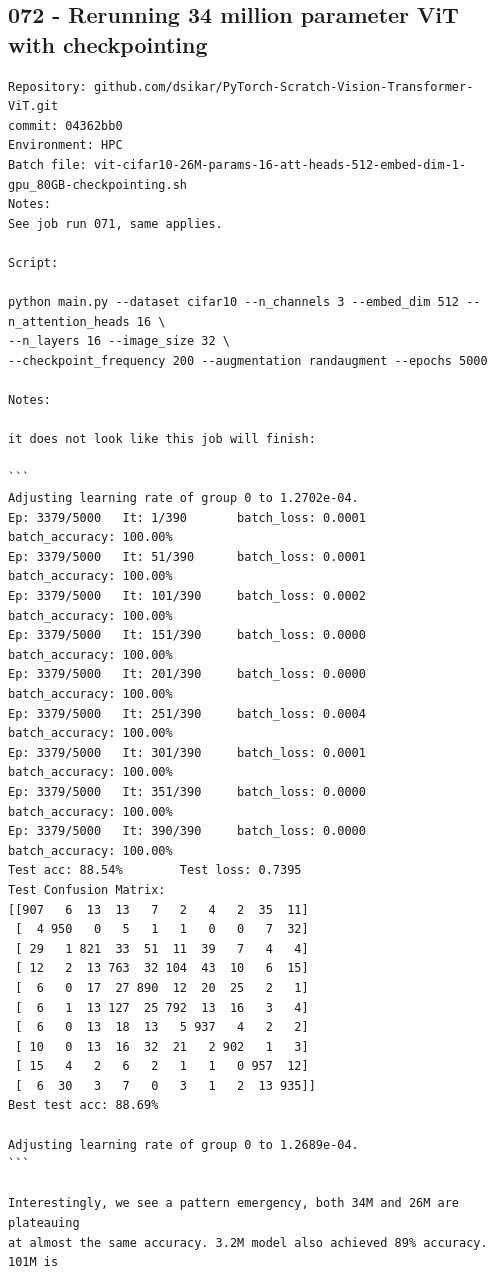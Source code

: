 \subsection{072 - Rerunning 34 million parameter ViT with checkpointing}
\label{app_res:072}
\begin{verbatim}
Repository: github.com/dsikar/PyTorch-Scratch-Vision-Transformer-ViT.git
commit: 04362bb0
Environment: HPC 
Batch file: vit-cifar10-26M-params-16-att-heads-512-embed-dim-1-gpu_80GB-checkpointing.sh
Notes: 
See job run 071, same applies.

Script:

python main.py --dataset cifar10 --n_channels 3 --embed_dim 512 --n_attention_heads 16 \
--n_layers 16 --image_size 32 \
--checkpoint_frequency 200 --augmentation randaugment --epochs 5000

Notes:

it does not look like this job will finish:

```
Adjusting learning rate of group 0 to 1.2702e-04.
Ep: 3379/5000   It: 1/390       batch_loss: 0.0001      batch_accuracy: 100.00%
Ep: 3379/5000   It: 51/390      batch_loss: 0.0001      batch_accuracy: 100.00%
Ep: 3379/5000   It: 101/390     batch_loss: 0.0002      batch_accuracy: 100.00%
Ep: 3379/5000   It: 151/390     batch_loss: 0.0000      batch_accuracy: 100.00%
Ep: 3379/5000   It: 201/390     batch_loss: 0.0000      batch_accuracy: 100.00%
Ep: 3379/5000   It: 251/390     batch_loss: 0.0004      batch_accuracy: 100.00%
Ep: 3379/5000   It: 301/390     batch_loss: 0.0001      batch_accuracy: 100.00%
Ep: 3379/5000   It: 351/390     batch_loss: 0.0000      batch_accuracy: 100.00%
Ep: 3379/5000   It: 390/390     batch_loss: 0.0000      batch_accuracy: 100.00%
Test acc: 88.54%        Test loss: 0.7395
Test Confusion Matrix:
[[907   6  13  13   7   2   4   2  35  11]
 [  4 950   0   5   1   1   0   0   7  32]
 [ 29   1 821  33  51  11  39   7   4   4]
 [ 12   2  13 763  32 104  43  10   6  15]
 [  6   0  17  27 890  12  20  25   2   1]
 [  6   1  13 127  25 792  13  16   3   4]
 [  6   0  13  18  13   5 937   4   2   2]
 [ 10   0  13  16  32  21   2 902   1   3]
 [ 15   4   2   6   2   1   1   0 957  12]
 [  6  30   3   7   0   3   1   2  13 935]]
Best test acc: 88.69%

Adjusting learning rate of group 0 to 1.2689e-04.
```

Interestingly, we see a pattern emergency, both 34M and 26M are plateauing
at almost the same accuracy. 3.2M model also achieved 89% accuracy.
101M is 

\end{verbatim}

